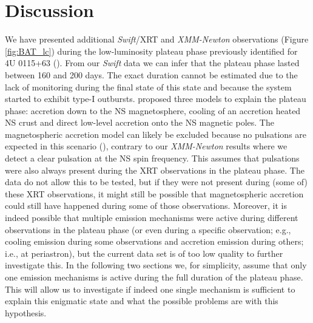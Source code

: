 \documentclass[a4paper,fleqn,usenatbib]{mnras}
\begin{document}
\section{Discussion}\label{sec:discussion}
We have presented additional \textit{Swift}/XRT and \textit{XMM-Newton} observations (Figure \ref{fig:BAT_lc}) during the low-luminosity plateau phase previously identified for 4U 0115+63 (\citealt{Wijnands2016}). From our \textit{Swift} data we can infer that the plateau phase lasted between 160 and 200 days. The exact duration cannot be estimated due to the lack of monitoring during the final state of this state and because the system started to exhibit type-I outbursts. \cite{Wijnands2016} proposed three models to explain the plateau phase: accretion down to the NS magnetosphere, cooling of an accretion heated NS crust and direct low-level accretion onto the NS magnetic poles. The magnetospheric accretion model can likely be excluded because no pulsations are expected in this scenario (\citealt{Campana2002}), contrary to our \textit{XMM-Newton} results where we detect a clear pulsation at the NS spin frequency. This assumes that pulsations were also always present during the XRT observations in the plateau phase. The data do not allow this to be tested, but if they were not present during (some of) these XRT observations, it might still be possible that magnetospheric accretion could still have happened during some of those observations. Moreover, it is indeed possible that multiple emission mechanisms were active during different observations in the plateau phase (or even during a specific observation; e.g., cooling emission during some observations and accretion emission during others; i.e., at periastron), but the current data set is of too low quality to further investigate this. In the following two sections we, for simplicity, assume that only one emission mechanisms is active during the full duration of the plateau phase. This will allow us to investigate if indeed one single mechanism is sufficient to explain this enigmatic state and what the possible problems are with this hypothesis.\\
\end{document}
